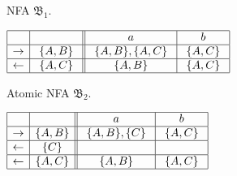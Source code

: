 \documentclass{llncs}
\newcommand{\fB}{{\mathfrak B}}
\begin{document}
\begin{example}
\begin{table}[hbt]
\begin{minipage}[b]{0.45\linewidth}
\caption{NFA $\fB_1$.}
\label{tab:b1}
\begin{center}
$
\begin{array}{|c| c||c| c| c|c|}    
\hline
& \ \  \ \ 
&\ \ a \ \ &\ \ b \ \   \\
\hline  
\rightarrow & \ \{A,B\} \
&  \ \{A,B\},\{A,C\} \  & \ \{A,C\} \    \\
\hline  
\leftarrow& \{A,C\}
&  \  \{A,B\} \  &  \{A,C \} \\
\hline  
\end{array}
$
\end{center}
\end{minipage}
\hspace{1cm}
\begin{minipage}[b]{0.45\linewidth}
\caption{Atomic NFA $\fB_2$.}
\label{tab:b2}
\begin{center}
$
\begin{array}{|c| c||c| c| }    
\hline
& \ \  \ \ 
&\ \ a \ \ &\ \ b \ \ \\
\hline  
\rightarrow & \{A,B\}
& \ \{A,B\},\{C\} \ & \ \{A,C\} \ \\
\hline  
\leftarrow& \ \{C\} \
&  & \\
\hline  
\leftarrow & \{A,C\}
 &  \{A,B\} &  \{A,C\}  \\
\hline  
\end{array}
$
\end{center}
\end{minipage}
\end{table}





\end{example}
\end{document}
